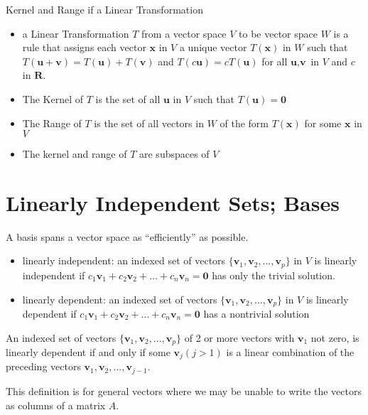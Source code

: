 \documentclass[../linalg.tex]{subfiles}
\begin{document}
Kernel and Range if a Linear Transformation
\begin{itemize}
    \item a Linear Transformation $T$ from a vector space $V$ to be vector space $W$ is a rule that assigns each vector $\textbf{x}$ in $V$ a unique vector $T(\textbf{x})$ in $W$ such that $T(\textbf{u}+\textbf{v})=T(\textbf{u})+T(\textbf{v})$ and 
    $T(c\textbf{u})=cT(\textbf{u})$ for all $\textbf{u},\textbf{v}$ in $V$ and $c$ in $\textbf{R}$.
    \item The Kernel of $T$ is the set of all $\textbf{u}$ in $V$ such that $T(\textbf{u})=\textbf{0}$ 
    \item The Range of $T$ is the set of all vectors in $W$ of the form $T(\textbf{x})$ for some $\textbf{x}$ in $V$
    \item The kernel and range of $T$ are subspaces of $V$
\end{itemize}



\section{Linearly Independent Sets; Bases}
A basis spans a vector space as ``efficiently'' as possible.
\begin{itemize}
    \item linearly independent: an indexed set of vectors $\{\textbf{v}_1,\textbf{v}_2,\dots,\textbf{v}_p\}$ in $V$ is linearly independent if $c_1\textbf{v}_1+c_2\textbf{v}_2+\dots+c_n\textbf{v}_n=\textbf{0}$ has only the trivial solution.
    \item linearly dependent: an indexed set of vectors $\{\textbf{v}_1,\textbf{v}_2,\dots,\textbf{v}_p\}$ in $V$ is linearly dependent if $c_1\textbf{v}_1+c_2\textbf{v}_2+\dots+c_n\textbf{v}_n=\textbf{0}$ has a nontrivial solution 
\end{itemize}

\begin{theorem}
    An indexed set of vectors $\{\textbf{v}_1,\textbf{v}_2,\dots,\textbf{v}_p\}$ of 2 or more vectors with $\textbf{v}_1$ not zero, is linearly dependent if and only if some $\textbf{v}_j(j>1)$ is a linear combination of the preceding vectors 
    $\textbf{v}_1,\textbf{v}_2,\dots,\textbf{v}_{j-1}$.

    This definition is for general vectors where we may be unable to write the vectors as columns of a matrix $A$.
\end{theorem}
\end{document}
